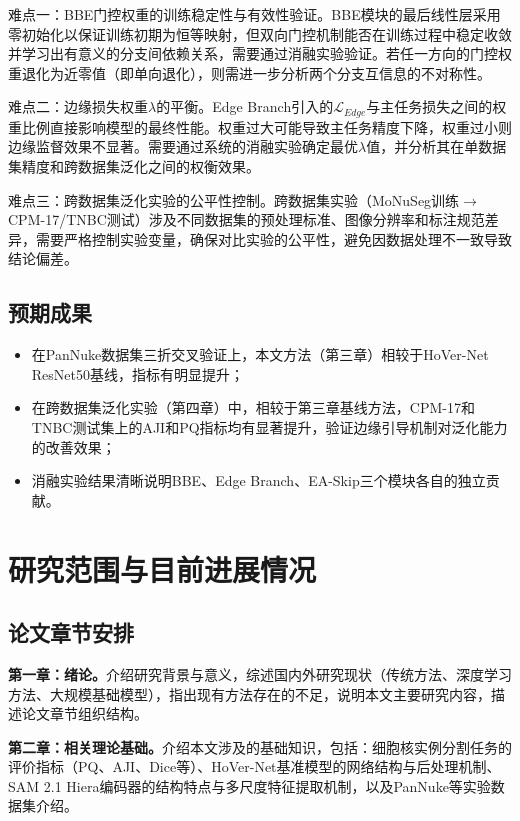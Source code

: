 \documentclass{sufethesismas}
\begin{document}
难点一：BBE门控权重的训练稳定性与有效性验证。BBE模块的最后线性层采用零初始化以保证训练初期为恒等映射，但双向门控机制能否在训练过程中稳定收敛并学习出有意义的分支间依赖关系，需要通过消融实验验证。若任一方向的门控权重退化为近零值（即单向退化），则需进一步分析两个分支互信息的不对称性。

难点二：边缘损失权重$\lambda$的平衡。Edge Branch引入的$\mathcal{L}_{Edge}$与主任务损失之间的权重比例直接影响模型的最终性能。权重过大可能导致主任务精度下降，权重过小则边缘监督效果不显著。需要通过系统的消融实验确定最优$\lambda$值，并分析其在单数据集精度和跨数据集泛化之间的权衡效果。

难点三：跨数据集泛化实验的公平性控制。跨数据集实验（MoNuSeg训练$\rightarrow$CPM-17/TNBC测试）涉及不同数据集的预处理标准、图像分辨率和标注规范差异，需要严格控制实验变量，确保对比实验的公平性，避免因数据处理不一致导致结论偏差。

\section{预期成果}

\begin{itemize}
  \item 在PanNuke数据集三折交叉验证上，本文方法（第三章）相较于HoVer-Net ResNet50基线，指标有明显提升；
  \item 在跨数据集泛化实验（第四章）中，相较于第三章基线方法，CPM-17和TNBC测试集上的AJI和PQ指标均有显著提升，验证边缘引导机制对泛化能力的改善效果；
  \item 消融实验结果清晰说明BBE、Edge Branch、EA-Skip三个模块各自的独立贡献。
\end{itemize}


\chapter{研究范围与目前进展情况}

\section{论文章节安排}

\textbf{第一章：绪论。}介绍研究背景与意义，综述国内外研究现状（传统方法、深度学习方法、大规模基础模型），指出现有方法存在的不足，说明本文主要研究内容，描述论文章节组织结构。

\textbf{第二章：相关理论基础。}介绍本文涉及的基础知识，包括：细胞核实例分割任务的评价指标（PQ、AJI、Dice等）、HoVer-Net基准模型的网络结构与后处理机制、SAM 2.1 Hiera编码器的结构特点与多尺度特征提取机制，以及PanNuke等实验数据集介绍。
\end{document}
